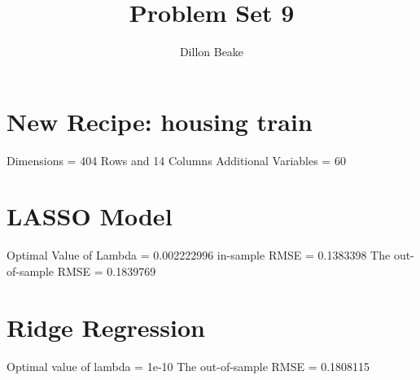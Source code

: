 \documentclass{article}
\title{Problem Set 9}
\author{Dillon Beake}
\begin{document}
\maketitle



\section{New Recipe: housing train}

Dimensions = 404 Rows and 14 Columns \newline Additional Variables = 60


\section{LASSO Model}

Optimal Value of Lambda = 0.002222996 \newline  in-sample RMSE = 0.1383398 \newline The out-of-sample RMSE = 0.1839769

\section{Ridge Regression}

Optimal value of lambda = 1e-10 \newline The out-of-sample RMSE = 0.1808115 
\end{document}
